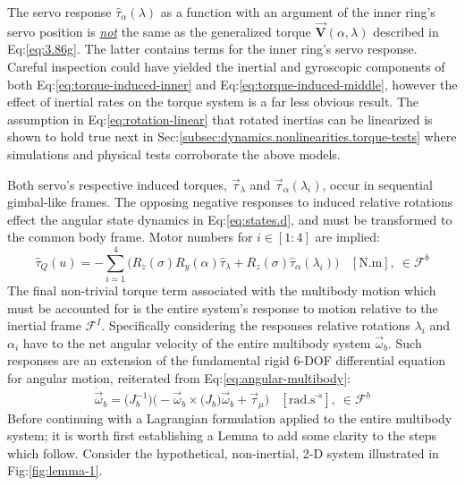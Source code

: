 The servo response $\hat{\tau}_\alpha(\lambda)$ as a function with an argument of the inner ring's servo position is \underline{\emph{not}} the same as the generalized torque $\vec{\mathbf{V}}(\alpha,\lambda)$ described in Eq:\ref{eq:3.86g}. The latter contains terms for the inner ring's servo response. Careful inspection could have yielded the inertial and gyroscopic components of both Eq:\ref{eq:torque-induced-inner} and Eq:\ref{eq:torque-induced-middle}, however the effect of inertial rates on the torque system is a far less obvious result. The assumption in Eq:\ref{eq:rotation-linear} that rotated inertias can be linearized is shown to hold true next in Sec:\ref{subsec:dynamics.nonlinearities.torque-tests} where simulations and physical tests corroborate the above models.
\par
Both servo's respective induced torques, $\vec{\tau}_\lambda$ and $\vec{\tau}_\alpha(\lambda_i)$, occur in sequential gimbal-like frames. The opposing negative responses to induced relative rotations effect the angular state dynamics in Eq:\ref{eq:states.d}, and must be transformed to the common body frame. Motor numbers for $i\in [1:4]$ are implied:
\begin{equation}\label{eq:torque-response}
\hat{\tau}_Q(u)=-\sum_{i=1}^4 \Big(R_z(\sigma)R_y(\alpha)\hat{\tau}_{\lambda}+R_z(\sigma)\hat{\tau}_{\alpha}(\lambda_i)\Big)~~~~[\text{N.m}],~\in\mathcal{F}^b
\end{equation}
The final non-trivial torque term associated with the multibody motion which must be accounted for is the entire system's response to motion relative to the inertial frame $\mathcal{F}^{I}$. Specifically considering the responses relative rotations $\lambda_i$ and $\alpha_i$ have to the net angular velocity of the entire multibody system $\vec{\omega}_b$. Such responses are an extension of the fundamental rigid 6-DOF differential equation for angular motion, reiterated from Eq:\ref{eq:angular-multibody}:
\begin{equation}
\dot{\vec{\omega}}_b=\big(J_b^{-1}\big)\Big(-\vec{\omega}_b\times\big(J_b\big)\vec{\omega}_b+\vec{\tau}_{\mu}\Big)~~~~[\text{rad.s}^{\text{-}s}],~\in\mathcal{F}^b
\end{equation}
Before continuing with a Lagrangian formulation applied to the entire multibody system; it is worth first establishing a Lemma to add some clarity to the steps which follow. Consider the hypothetical, non-inertial, 2-D system illustrated in Fig:\ref{fig:lemma-1}. 
